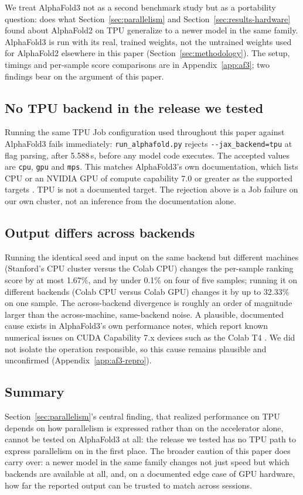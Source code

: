 
We treat AlphaFold3 not as a second benchmark study but as a portability
question: does what Section~\ref{sec:parallelism} and
Section~\ref{sec:results-hardware} found about AlphaFold2 on TPU
generalize to a newer model in the same family. AlphaFold3 is run with
its real, trained weights, not the untrained weights used for AlphaFold2
elsewhere in this paper (Section~\ref{sec:methodology}). The setup,
timings and per-sample score comparisons are in
Appendix~\ref{app:af3}; two findings bear on the argument of this
paper.

\subsection{No TPU backend in the release we tested}
\label{sec:af3-tpu}

Running the same TPU Job configuration used throughout this paper
against AlphaFold3 fails immediately: \texttt{run\_alphafold.py} rejects
\texttt{-{}-jax\_backend=tpu} at flag parsing, after 5.588\,s, before any
model code executes. The accepted values are \texttt{cpu}, \texttt{gpu}
and \texttt{mps}.
This matches AlphaFold3's own documentation, which lists CPU or an
NVIDIA GPU of compute capability 7.0 or greater as the supported
targets \citep{af3docs2026}. TPU is not a documented target. The
rejection above is a Job failure on our own cluster, not an inference
from the documentation alone.


\subsection{Output differs across backends}
\label{sec:af3-body-repro}

Running the identical seed and input on the same backend but different
machines (Stanford's CPU cluster versus the Colab CPU) changes the
per-sample ranking score by at most 1.67\%, and by under 0.1\% on four
of five samples; running it on different backends (Colab CPU versus
Colab GPU) changes it by up to 32.33\% on one sample.
The across-backend divergence is roughly an order of magnitude larger
than the across-machine, same-backend noise. A plausible, documented
cause exists in AlphaFold3's own performance notes, which report known
numerical issues on CUDA Capability 7.x devices such as the Colab T4
\citep{af3docs2026}. We did not isolate the operation responsible, so
this cause remains plausible and unconfirmed
(Appendix~\ref{app:af3-repro}).

\subsection{Summary}
\label{sec:af3-summary}

Section~\ref{sec:parallelism}'s central finding, that realized
performance on TPU depends on how parallelism is expressed rather than
on the accelerator alone, cannot be tested on AlphaFold3 at all: the
release we tested has no TPU path to express parallelism on in the
first place. The broader caution of this paper does carry over: a
newer model in the same family changes not just speed but which
backends are available at all, and, on a documented edge case of GPU
hardware, how far the reported output can be trusted to match across
sessions.
